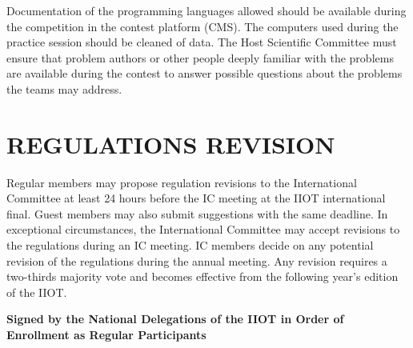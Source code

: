 \documentclass{article}
\begin{document}
Documentation of the programming languages allowed should be available during the competition in the contest platform (CMS). The computers used during the practice session should be cleaned of data. The Host Scientific Committee must ensure that problem authors or other people deeply familiar with the problems are available during the contest to answer possible questions about the problems the teams may address.

\section{REGULATIONS REVISION}

Regular members may propose regulation revisions to the International Committee at least 24 hours before the IC meeting at the IIOT international final. Guest members may also submit suggestions with the same deadline. In exceptional circumstances, the International Committee may accept revisions to the regulations during an IC meeting. IC members decide on any potential revision of the regulations during the annual meeting. Any revision requires a two-thirds majority vote and becomes effective from the following year's edition of the IIOT.


\begin{center}
\textbf{Signed by the National Delegations of the IIOT in Order of Enrollment as Regular Participants}
\end{center}
\end{document}
